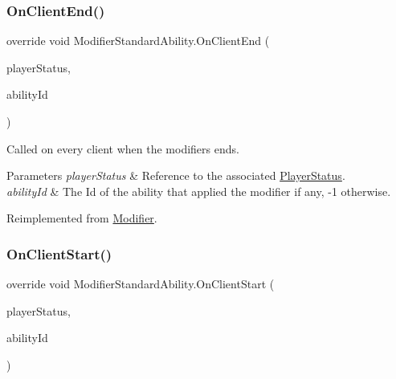 \subsubsection{\texorpdfstring{On\+Client\+End()}{OnClientEnd()}}
{\footnotesize\ttfamily override void Modifier\+Standard\+Ability.\+On\+Client\+End (\begin{DoxyParamCaption}\item[{\hyperlink{class_player_status}{Player\+Status}}]{player\+Status,  }\item[{int}]{ability\+Id }\end{DoxyParamCaption})\hspace{0.3cm}{\ttfamily [virtual]}}



Called on every client when the modifiers ends. 


\begin{DoxyParams}{Parameters}
{\em player\+Status} & Reference to the associated \hyperlink{class_player_status}{Player\+Status}.\\
\hline
{\em ability\+Id} & The Id of the ability that applied the modifier if any, -\/1 otherwise.\\
\hline
\end{DoxyParams}


Reimplemented from \hyperlink{class_modifier_af9a32f8313b83253dac318eed1ebd7ac}{Modifier}.

\hypertarget{class_modifier_standard_ability_a92fa22504144748d8f3fc6df932da9c1}{}\label{class_modifier_standard_ability_a92fa22504144748d8f3fc6df932da9c1} 
\subsubsection{\texorpdfstring{On\+Client\+Start()}{OnClientStart()}}
{\footnotesize\ttfamily override void Modifier\+Standard\+Ability.\+On\+Client\+Start (\begin{DoxyParamCaption}\item[{\hyperlink{class_player_status}{Player\+Status}}]{player\+Status,  }\item[{int}]{ability\+Id }\end{DoxyParamCaption})\hspace{0.3cm}{\ttfamily [virtual]}}



